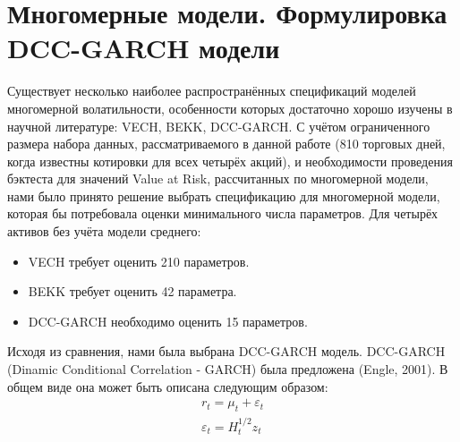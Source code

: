 \documentclass[a4paper,11pt]{article}
\begin{document}

\section{Многомерные модели. Формулировка DCC-GARCH модели}%


Существует несколько наиболее распространённых спецификаций моделей многомерной волатильности, особенности которых достаточно хорошо изучены в научной литературе: VECH, BEKK, DCC-GARCH. С учётом ограниченного размера набора данных, рассматриваемого в данной работе (810 торговых дней, когда известны котировки для всех четырёх акций), и необходимости проведения бэктеста для значений Value at Risk, рассчитанных по многомерной модели, нами было принято решение выбрать спецификацию для многомерной модели, которая бы потребовала оценки минимального числа параметров. Для четырёх активов без учёта модели среднего:
\begin{itemize}
    \item VECH требует оценить 210 параметров.
    \item BEKK требует оценить 42 параметра.
    \item DCC-GARCH необходимо оценить 15 параметров.
\end{itemize}

Исходя из сравнения, нами была выбрана DCC-GARCH модель. DCC-GARCH (Dinamic Conditional Correlation - GARCH) была предложена (Engle, 2001). В общем виде она может быть описана следующим образом:
\begin{equation}
\begin{aligned}
               r_t = \mu_t + \varepsilon_t \\
               \varepsilon_t = H^{1/2}_t z_t
\end{aligned}
\end{equation}
\end{document}
